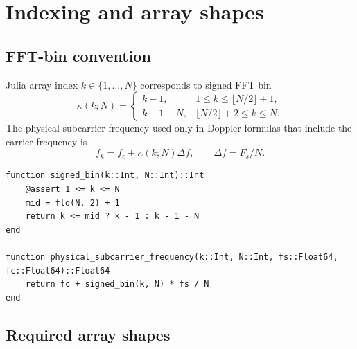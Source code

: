 \documentclass[11pt]{article}
\begin{document}
\clearpage
\section{Indexing and array shapes}
\label{sec:indexing}

\subsection{FFT-bin convention}

Julia array index $k\in\{1,\ldots,N\}$ corresponds to signed FFT bin
\begin{equation}
\kappa(k;N)=
\begin{cases}
 k-1, & 1\le k\le \lfloor N/2\rfloor+1,\\
 k-1-N, & \lfloor N/2\rfloor+2\le k\le N.
\end{cases}
\end{equation}
The physical subcarrier frequency used only in Doppler formulas that include the carrier frequency is
\begin{equation}
f_k=f_c+\kappa(k;N)\Delta f,\qquad \Delta f=F_s/N.
\end{equation}

\begin{lstlisting}
function signed_bin(k::Int, N::Int)::Int
    @assert 1 <= k <= N
    mid = fld(N, 2) + 1
    return k <= mid ? k - 1 : k - 1 - N
end

function physical_subcarrier_frequency(k::Int, N::Int, fs::Float64, fc::Float64)::Float64
    return fc + signed_bin(k, N) * fs / N
end
\end{lstlisting}

\subsection{Required array shapes}
\end{document}
